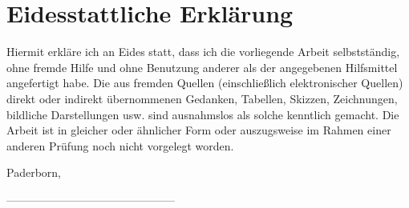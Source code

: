 \noindent
\section*{Eidesstattliche Erklärung}

Hiermit erkläre ich an Eides statt, dass ich die vorliegende Arbeit selbstständig, ohne fremde Hilfe und ohne Benutzung anderer als der angegebenen Hilfsmittel angefertigt habe. Die aus fremden Quellen (einschließlich elektronischer Quellen) direkt oder indirekt übernommenen Gedanken, Tabellen, Skizzen, Zeichnungen, bildliche Darstellungen usw. sind ausnahmslos als solche kenntlich gemacht. Die Arbeit ist in gleicher oder ähnlicher Form oder auszugsweise im Rahmen einer anderen Prüfung noch nicht vorgelegt worden.

\bigskip

Paderborn, \abgabedatum

\begin{flushright}
\bigskip
\bigskip
\bigskip

---------------------------------------------\\
\name
\end{flushright}